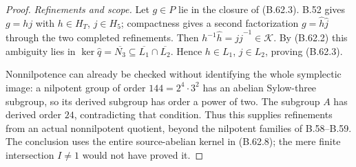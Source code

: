 \begin{proof}
\emph{Refinements and scope.}
Let $g\in P$ lie in the closure of (B.62.3).
B.52 gives $g=hj$ with $h\in H_T$, $j\in H_5$;
compactness gives a second factorization
$g=\hat h\hat j$ through the two completed refinements.
Then $h^{-1}\hat h=j\hat j^{-1}\in\mathcal K$.
By (B.62.2) this ambiguity lies in
$\ker\widehat q=\overline{N_3}\subseteq
\overline{L_1}\cap\overline{L_2}$.
Hence $h\in L_1$, $j\in L_2$, proving (B.62.3).

Nonnilpotence can already be checked without identifying
the whole symplectic image: a nilpotent group of order
$144=2^4\cdot3^2$ has an abelian Sylow-three subgroup,
so its derived subgroup has order a power of two.
The subgroup $A$ has derived order $24$, contradicting
that condition.  Thus this supplies refinements from
an actual nonnilpotent quotient, beyond the nilpotent
families of B.58--B.59.
The conclusion uses the entire source-abelian kernel in
(B.62.8); the mere finite intersection $I\ne1$ would not
have proved it.
\end{proof}
